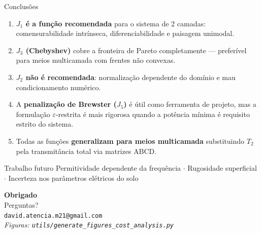 \documentclass[aspectratio=169, 10pt]{beamer}
\begin{document}
\begin{frame}{Conclusões}
  \begin{enumerate}
    \setlength\itemsep{0.55em}
    \item \textbf{$J_1$ é a função recomendada} para o sistema de 2 camadas:
          comensurabilidade intrínseca, diferenciabilidade e paisagem unimodal.

    \item \textbf{$J_3$ (Chebyshev)} cobre a fronteira de Pareto completamente
          --- preferível para meios multicamada com frentes não convexas.

    \item \textbf{$J_2$ não é recomendada}: normalização dependente do domínio
          e mau condicionamento numérico.

    \item A \textbf{penalização de Brewster ($J_5$)} é útil como ferramenta
          de projeto, mas a formulação $\varepsilon$-restrita é mais rigorosa
          quando a potência mínima é requisito estrito do sistema.

    \item Todas as funções \textbf{generalizam para meios multicamada}
          substituindo $T_2$ pela transmitância total via matrizes ABCD.
  \end{enumerate}

  \vspace{0.7em}
  \begin{block}{Trabalho futuro}
    \small
    Permitividade dependente da frequência $\cdot$
    Rugosidade superficial $\cdot$
    Incerteza nos parâmetros elétricos do solo
  \end{block}
\end{frame}

{
\begin{frame}[plain]
  \vfill
  \centering
  {\Large\bfseries\color{azulSAR} Obrigado}\\[1em]
  \large Perguntas?\\[1.5em]
  \normalsize\texttt{david.atencia.m21@gmail.com}\\[0.8em]
  \small\textit{Figuras: \texttt{utils/generate\_figures\_cost\_analysis.py}}
  \vfill
\end{frame}
}
\end{document}
